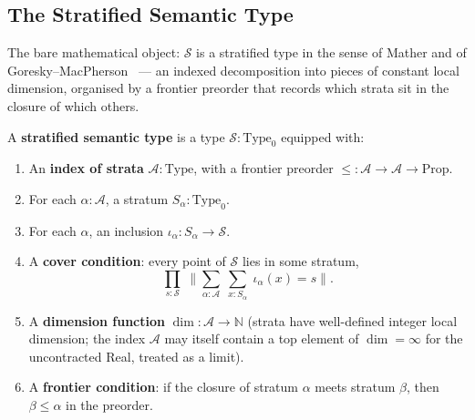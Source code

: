\subsection{The Stratified Semantic Type}
\label{subsec:stratified}

The bare mathematical object: $\mathcal{S}$ is a stratified type in the sense of Mather and of Goresky--MacPherson~\cite{mather2012notes,goresky1988stratified} — an indexed decomposition into pieces of constant local dimension, organised by a frontier preorder that records which strata sit in the closure of which others.

\begin{definition}\label{def:stratified}
A \textbf{stratified semantic type} is a type $\mathcal{S} : \mathrm{Type}_0$ equipped with:
\begin{enumerate}
    \item An \textbf{index of strata} $\mathcal{A} : \mathrm{Type}$, with a frontier preorder ${\leq} : \mathcal{A} \to \mathcal{A} \to \mathrm{Prop}$.
    \item For each $\alpha : \mathcal{A}$, a stratum $S_\alpha : \mathrm{Type}_0$.
    \item For each $\alpha$, an inclusion $\iota_\alpha : S_\alpha \to \mathcal{S}$.
    \item A \textbf{cover condition}: every point of $\mathcal{S}$ lies in some stratum,
    \[
    \prod_{s : \mathcal{S}}\; \Big\| \sum_{\alpha : \mathcal{A}}\; \sum_{x : S_\alpha}\; \iota_\alpha(x) = s \Big\|.
    \]
    \item A \textbf{dimension function} $\dim : \mathcal{A} \to \mathbb{N}$ (strata have well-defined integer local dimension; the index $\mathcal{A}$ may itself contain a top element of $\dim = \infty$ for the uncontracted Real, treated as a limit).
    \item A \textbf{frontier condition}: if the closure of stratum $\alpha$ meets stratum $\beta$, then $\beta \leq \alpha$ in the preorder.
\end{enumerate}
\end{definition}

